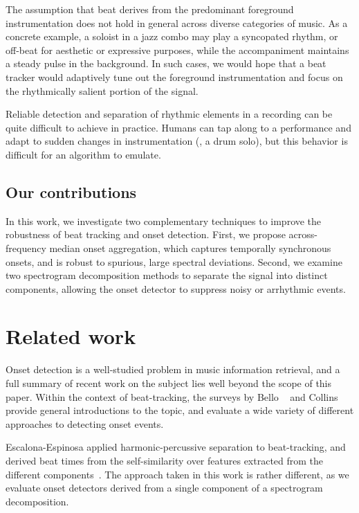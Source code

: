 \documentclass{article}
\begin{document}
The assumption that beat derives from the predominant foreground instrumentation does not 
hold in general across diverse categories of music. As a concrete example, a soloist in a 
jazz combo may play a syncopated rhythm, or off-beat for aesthetic or expressive purposes, 
while the accompaniment maintains a steady pulse in the background.  
In such cases, we would hope that a beat tracker would adaptively tune out the foreground 
instrumentation and focus on the rhythmically salient portion of the signal.

Reliable detection and separation of rhythmic elements in a recording can be quite
difficult to achieve in practice.  Humans can tap along to a
performance and adapt to sudden changes in instrumentation (\eg, a drum solo), but 
this behavior is difficult for an algorithm to emulate.

\subsection{Our contributions}
In this work, we investigate two complementary techniques to improve the robustness of 
beat tracking and onset detection. 
First, we propose across-frequency median onset aggregation, which captures temporally synchronous onsets, and is robust to spurious, large spectral deviations.
Second, we examine two spectrogram decomposition methods to separate the signal into distinct components, allowing the onset detector to suppress noisy or arrhythmic events. 

\section{Related work}
\label{sec:related}
Onset detection is a well-studied problem in music information retrieval, and a full
summary of recent work on the subject lies well beyond the scope of this paper.
Within the context of beat-tracking, the surveys by Bello \etal~\cite{bello2005tutorial}
and Collins~\cite{collins2005comparison} provide general introductions to the topic, and
evaluate a wide variety of different approaches to detecting onset events.  

Escalona-Espinosa applied harmonic-percussive separation to beat-tracking, and derived beat 
times from the self-similarity over features extracted from the different 
components~\cite{escalona2008downbeat}.  The approach taken in this work is rather
different, as we evaluate onset detectors derived from a single component of a
spectrogram decomposition.
\end{document}
